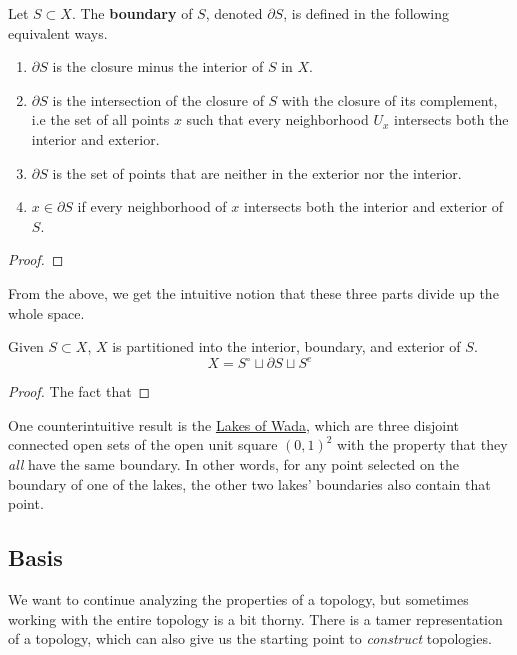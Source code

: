   \begin{definition}[Boundary]
    Let $S \subset X$. The \textbf{boundary} of $S$, denoted $\partial S$, is defined in the following equivalent ways. 
    \begin{enumerate}
      \item $\partial S$ is the closure minus the interior of $S$ in $X$. 
      \item $\partial S$ is the intersection of the closure of $S$ with the closure of its complement, i.e the set of all points $x$ such that every neighborhood $U_x$ intersects both the interior and exterior. 
      \item $\partial S$ is the set of points that are neither in the exterior nor the interior. 
      \item $x \in \partial S$ if every neighborhood of $x$ intersects both the interior and exterior of $S$. 
    \end{enumerate}
  \end{definition}
  \begin{proof}
    
  \end{proof}

  From the above, we get the intuitive notion that these three parts divide up the whole space. 

  \begin{theorem}
    Given $S \subset X$, $X$ is partitioned into the interior, boundary, and exterior of $S$. 
    \begin{equation}
      X = S^\circ \sqcup \partial S \sqcup S^e
    \end{equation}
  \end{theorem}
  \begin{proof}
    The fact that 
  \end{proof}

  One counterintuitive result is the \href{https://en.wikipedia.org/wiki/Lakes_of_Wada}{Lakes of Wada}, which are three disjoint connected open sets of the open unit square $(0, 1)^2$ with the property that they \textit{all} have the same boundary. In other words, for any point selected on the boundary of one of the lakes, the other two lakes' boundaries also contain that point. 

\subsection{Basis} 

  We want to continue analyzing the properties of a topology, but sometimes working with the entire topology is a bit thorny. There is a tamer representation of a topology, which can also give us the starting point to \textit{construct} topologies. 

